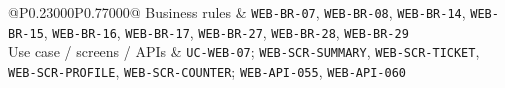 \begin{longtable}{@{}P{0.23000\SRSWidth}P{0.77000\SRSWidth}@{}}
Business rules & \texttt{WEB-\allowbreak{}BR-\allowbreak{}07}, \texttt{WEB-\allowbreak{}BR-\allowbreak{}08}, \texttt{WEB-\allowbreak{}BR-\allowbreak{}14}, \texttt{WEB-\allowbreak{}BR-\allowbreak{}15}, \texttt{WEB-\allowbreak{}BR-\allowbreak{}16}, \texttt{WEB-\allowbreak{}BR-\allowbreak{}17}, \texttt{WEB-\allowbreak{}BR-\allowbreak{}27}, \texttt{WEB-\allowbreak{}BR-\allowbreak{}28}, \texttt{WEB-\allowbreak{}BR-\allowbreak{}29} \\[3pt]
Use case /\allowbreak{} screens /\allowbreak{} APIs & \texttt{UC-\allowbreak{}WEB-\allowbreak{}07}; \texttt{WEB-\allowbreak{}SCR-\allowbreak{}SUMMARY}, \texttt{WEB-\allowbreak{}SCR-\allowbreak{}TICKET}, \texttt{WEB-\allowbreak{}SCR-\allowbreak{}PROFILE}, \texttt{WEB-\allowbreak{}SCR-\allowbreak{}COUNTER}; \texttt{WEB-\allowbreak{}API-\allowbreak{}055}, \texttt{WEB-\allowbreak{}API-\allowbreak{}060} \\[3pt]
\end{longtable}
\endgroup

